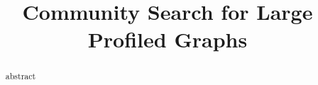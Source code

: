 \documentclass{vldb}
\begin{document}
\title{Community Search for Large Profiled Graphs}

\maketitle
\begin{abstract}
abstract
\end{abstract}








\clearpage

\vspace{0.99em}
\small{}
\end{document}
